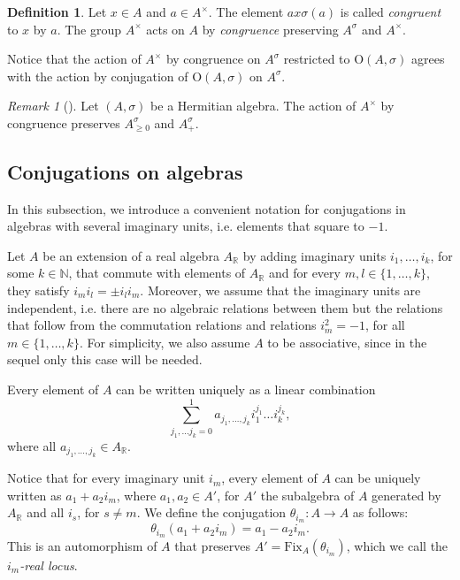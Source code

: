 \documentclass[oneside,11pt]{amsart}
\theoremstyle{definition}
\newtheorem{defn}[thm]{Definition}
\theoremstyle{remark}
\newtheorem{rem}[thm]{Remark}
\numberwithin{thm}{section}
\numberwithin{equation}{section}
\begin{document}
\begin{defn}
Let $x\in A$ and $a\in A^\times$. The element $ax\sigma(a)$ is called \emph{congruent} to $x$ by $a$. The group $A^\times$ acts on $A$ by \emph{congruence} preserving $A^\sigma$ and $A^\times$.
\end{defn}

Notice that the action of $A^\times$ by congruence on $A^\sigma$ restricted to $\mathrm{O}{(A,\sigma)}$ agrees with the action by conjugation of $\mathrm{O}{(A,\sigma)}$ on $A^\sigma$.

\begin{rem}[{\cite[Corollary~2.65]{ABRRW}}]
Let $(A,\sigma)$ be a Hermitian algebra. The action of $A^\times$ by congruence preserves $A^\sigma_{\geq 0}$ and $A^\sigma_{+}$. 
\end{rem}

\subsection{Conjugations on algebras}\label{sec:conjugations}

In this subsection, we introduce a convenient notation for conjugations in algebras with several imaginary units, i.e. elements that square to $-1$.

Let $A$ be an extension of a real algebra $A_\mathbb R$ by adding imaginary units $i_1,\dots,i_k$, for some $k\in\mathbb N$, that commute with elements of $A_\mathbb R$ and for every $m,l\in\{1,\dots,k\}$, they satisfy $i_m i_l=\pm i_l i_m$. Moreover, we assume that the imaginary units are independent, i.e. there are no algebraic relations between them but the relations that follow from the commutation relations and relations $i_m^2=-1$, for all $m\in\{1,\dots,k\}$. For simplicity, we also assume $A$ to be associative, since in the sequel only this case will be needed.

Every element of $A$ can be written uniquely as a linear combination 
$$\sum_{j_1,\dots j_k=0}^1 a_{j_1,\dots,j_k} i_1^{j_1}\dots i_k^{j_k},$$ 
where all $a_{j_1,\dots,j_k}\in A_\mathbb R$. 

Notice that for every imaginary unit $i_m$, every element of $A$ can be uniquely written as $a_1+a_2i_m$, where $a_1,a_2\in A'$, for $A'$ the subalgebra of $A$ generated by $A_\mathbb R$ and all $i_s$, for $s\neq m$.  We define the conjugation $\theta_{i_m}\colon A\to A$ as follows: 
$$\theta_{i_m}(a_1+a_2i_m)=a_1-a_2i_m.$$ 
This is an automorphism of $A$ that preserves $A'=\mathrm{Fix}_A(\theta_{i_m})$, which we call the \emph{$i_m$-real locus}.
\end{document}
